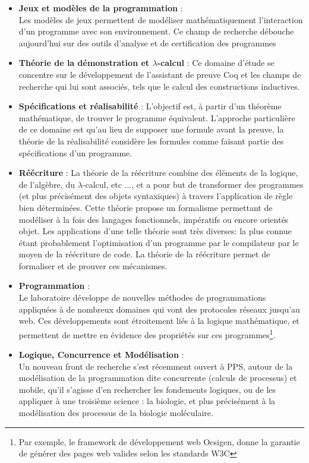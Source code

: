 \documentclass[a4paper, 11pt]{report}
\newcommand{\lc}[0]{$\lambda$-calcul\xspace}
\begin{document}
      \begin{itemize}
        \item \textbf{Jeux et modèles de la programmation} : \\
          Les modèles de jeux permettent de modéliser mathématiquement
          l'interaction d'un programme avec son environnement. Ce champ de
          recherche débouche aujourd'hui sur des outils d'analyse et de
          certification des programmes
        \item \textbf{Théorie de la démonstration et \lc} :
          Ce domaine d'étude se concentre sur le développement de l'assistant
          de preuve Coq et les champs de recherche qui lui sont associés,
          tels que le calcul des constructions inductives.
        \item \textbf{Spécifications et réalisabilité} :
          L'objectif est, à partir d'un théorème mathématique, de trouver
          le programme équivalent. L'approche particulière de ce domaine est
          qu'au lieu de supposer une formule avant la preuve, la théorie de la
          réalisabilité considère les formules comme faisant partie des
          spécifications d'un programme.
        \item \textbf{Réécriture} :
          La théorie de la réécriture combine des éléments de la logique, de
          l'algèbre, du \lc, etc $\ldots$, et a pour but de transformer des
          programmes (et plus précisément des objets syntaxiques) à travers
          l'application de règle bien déterminées. Cette théorie propose
          un formalisme permettant de modéliser à la fois des langages
          fonctionnels, impératifs ou encore orientés objet.
          Les applications d'une telle théorie sont très diverses: la plus
          connue étant probablement l'optimisation d'un programme par le
          compilateur par le moyen de la réécriture de code.
          La théorie de la réécriture permet de formaliser et de prouver ces
          mécanismes.
        \item \textbf{Programmation} : \\
          Le laboratoire développe de nouvelles méthodes de programmations
          appliquées à de nombreux domaines qui vont des protocoles réseaux
          jusqu'au web. Ces développements sont étroitement liés à la
          logique mathématique, et permettent de mettre en évidence des
          propriétés sur ces programmes\footnote{Par exemple, le framework de
          développement web Ocsigen, donne la garantie de générer des pages
          web valides selon les standards W3C}.
        \item \textbf{Logique, Concurrence et Modélisation} : \\
          Un nouveau front de recherche s'est récemment ouvert à PPS, autour
          de la modélisation de la programmation dite concurrente (calculs de
          processus) et mobile, qu'il s'agisse d'en rechercher les fondements
          logiques, ou de les appliquer à une troisième science : la
          biologie, et plus précisément à la modélisation des processus de
          la biologie moléculaire.
      \end{itemize}
\end{document}
